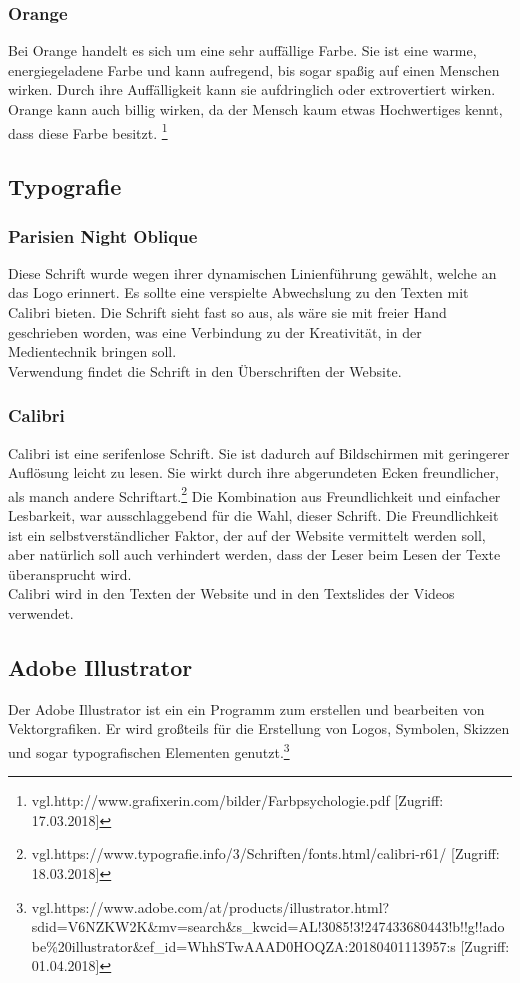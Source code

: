 \subsubsection{Orange}
Bei Orange handelt es sich um eine sehr auffällige Farbe. Sie ist eine warme, energiegeladene Farbe und kann aufregend, bis sogar spaßig auf einen Menschen wirken. Durch ihre Auffälligkeit kann sie aufdringlich oder extrovertiert wirken. Orange kann auch billig wirken, da der Mensch kaum etwas Hochwertiges kennt, dass diese Farbe besitzt. \footnote{\label{} vgl.http://www.grafixerin.com/bilder/Farbpsychologie.pdf [Zugriff: 17.03.2018]}

\subsection{Typografie}
\subsubsection{Parisien Night Oblique}
Diese Schrift wurde wegen ihrer dynamischen Linienführung gewählt, welche an das Logo erinnert. Es sollte eine verspielte Abwechslung zu den Texten mit Calibri bieten. Die Schrift sieht fast so aus, als wäre sie mit freier Hand geschrieben worden, was eine Verbindung zu der Kreativität, in der Medientechnik bringen soll.
\\
Verwendung findet die Schrift in den Überschriften der Website.

\subsubsection{Calibri}
Calibri ist eine serifenlose Schrift. Sie ist dadurch auf Bildschirmen mit geringerer Auflösung leicht zu lesen. Sie wirkt durch ihre abgerundeten Ecken freundlicher, als manch andere Schriftart.\footnote{\label{} vgl.https://www.typografie.info/3/Schriften/fonts.html/calibri-r61/ [Zugriff: 18.03.2018]} Die Kombination aus Freundlichkeit und einfacher Lesbarkeit, war ausschlaggebend für die Wahl, dieser Schrift. Die Freundlichkeit ist ein selbstverständlicher Faktor, der auf der Website vermittelt werden soll, aber natürlich soll auch verhindert werden, dass der Leser beim Lesen der Texte überansprucht wird.
\\
Calibri wird in den Texten der Website und in den Textslides der Videos verwendet.

\subsection{Adobe Illustrator}
Der Adobe Illustrator ist ein ein Programm zum erstellen und bearbeiten von Vektorgrafiken. Er wird großteils für die Erstellung von Logos, Symbolen, Skizzen und sogar typografischen Elementen genutzt.\footnote{\label{} vgl.https://www.adobe.com/at/products/illustrator.html?sdid=V6NZKW2K\&mv=search\&s\_kwcid=AL!3085!3!247433680443!b!!g!!adobe\%20illustrator\&ef\_id=WhhSTwAAAD0HOQZA:20180401113957:s [Zugriff: 01.04.2018]}
